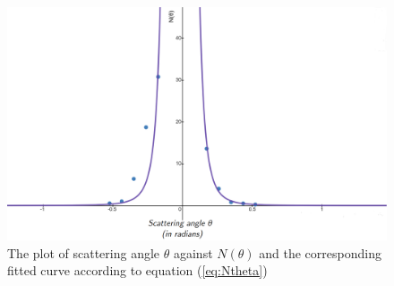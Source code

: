 \documentclass[%
 reprint,
nofootinbib,
 amsmath,amssymb,
 aps,
floatfix,
]{revtex4-2}
\begin{document}
    \begin{figure}
        \centering
        \includegraphics[scale = 0.2]{Figures/graph.png}
        \caption{The plot of scattering angle $\theta$ against $N(\theta)$ and the corresponding fitted curve according to equation (\ref{eq:Ntheta})}
        \label{fig:graph}
    \end{figure}
\end{document}
